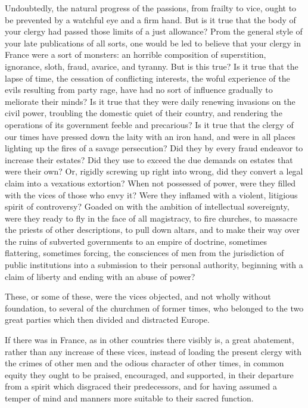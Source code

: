Undoubtedly, the natural progress of the passions, from frailty to vice, ought to be prevented by a watchful eye and a firm hand. But is it true that the body of your clergy had passed those limits of a just allowance? Prom the general style of your late publications of all sorts, one would be led to believe that your clergy in France were a sort of monsters: an horrible composition of superstition, ignorance, sloth, fraud, avarice, and tyranny. But is this true? Is it true that the lapse of time, the cessation of conflicting interests, the woful experience of the evils resulting from party rage, have had no sort of influence gradually to meliorate their minds? Is it true that they were daily renewing invasions on the civil power, troubling the domestic quiet of their country, and rendering the operations of its government feeble and precarious? Is it true that the clergy of our times have pressed down the laity with an iron hand, and were in all places lighting up the fires of a savage persecution? Did they by every fraud endeavor to increase their estates? Did they use to exceed the due demands on estates that were their own? Or, rigidly screwing up right into wrong, did they convert a legal claim into a vexatious extortion? When not possessed of power, were they filled with the vices of those who envy it? Were they inflamed with a violent, litigious spirit of controversy? Goaded on with the ambition of intellectual sovereignty, were they ready to fly in the face of all magistracy, to fire churches, to massacre the priests of other descriptions, to pull down altars, and to make their way over the ruins of subverted governments to an empire of doctrine, sometimes flattering, sometimes forcing, the consciences of men from the jurisdiction of public institutions into a submission to their personal authority, beginning with a claim of liberty and ending with an abuse of power?

These, or some of these, were the vices objected, and not wholly without foundation, to several of the churchmen of former times, who belonged to the two great parties which then divided and distracted Europe.

If there was in France, as in other countries there visibly is, a great abatement, rather than any increase of these vices, instead of loading the present clergy with the crimes of other men and the odious character of other times, in common equity they ought to be praised, encouraged, and supported, in their departure from a spirit which disgraced their predecessors, and for having assumed a temper of mind and manners more suitable to their sacred function.

